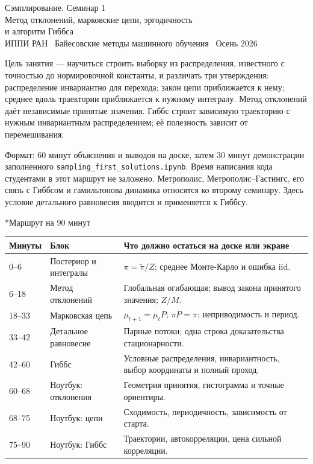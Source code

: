 \documentclass[11pt,a4paper]{article}
\makeatletter
\renewcommand\section{\@startsection{section}{1}{\z@}{-3.0ex \@plus -1ex \@minus -.2ex}{1.5ex \@plus .2ex}{\normalfont\Large}}
\makeatother
\begin{document}
\begin{center}
{\LARGE Сэмплирование. Семинар 1}\\[5pt]
{\large Метод отклонений, марковские цепи, эргодичность\\
и алгоритм Гиббса}\\[5pt]
ИППИ РАН \textbar\ Байесовские методы машинного обучения \textbar\ Осень 2026
\end{center}

Цель занятия --- научиться строить выборку из распределения, известного с
точностью до нормировочной константы, и различать три утверждения:
распределение инвариантно для перехода; закон цепи приближается к нему;
среднее вдоль траектории приближается к нужному интегралу. Метод отклонений
даёт независимые принятые значения. Гиббс строит зависимую траекторию с
нужным инвариантным распределением; её полезность зависит от перемешивания.

Формат: 60 минут объяснения и выводов на доске, затем 30 минут демонстрации
заполненного \texttt{sampling\_first\_solutions.ipynb}. Время написания кода
студентами в этот маршрут не заложено. Метрополис, Метрополис--Гастингс,
его связь с Гиббсом и гамильтонова динамика относятся ко второму семинару.
Здесь условие детального равновесия вводится и применяется к Гиббсу.

\section*{Маршрут на 90 минут}
\begin{center}\small
\begin{tabular}{@{}p{15mm}p{47mm}p{99mm}@{}}
\toprule
Минуты & Блок & Что должно остаться на доске или экране\\
\midrule
0--6 & Постериор и интегралы & $\pi=\widetilde\pi/Z$; среднее Монте-Карло и ошибка iid.\\
6--18 & Метод отклонений & Глобальная огибающая; вывод закона принятого значения; $Z/M$.\\
18--33 & Марковская цепь & $\mu_{t+1}=\mu_tP$; $\pi P=\pi$; неприводимость и период.\\
33--42 & Детальное равновесие & Парные потоки; одна строка доказательства стационарности.\\
42--60 & Гиббс & Условные распределения, инвариантность, выбор координаты и полный проход.\\
\midrule
60--68 & Ноутбук: отклонения & Геометрия принятия, гистограмма и точные ориентиры.\\
68--75 & Ноутбук: цепи & Сходимость, периодичность, зависимость от старта.\\
75--90 & Ноутбук: Гиббс & Траектории, автокорреляции, цена сильной корреляции.\\
\bottomrule
\end{tabular}\end{center}
\end{document}
